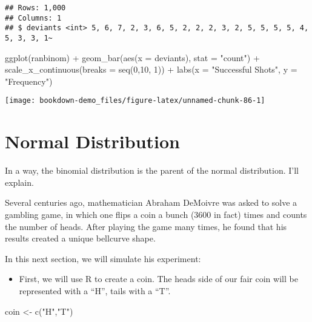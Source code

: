\documentclass[
]{book}
\newenvironment{Shaded}{\begin{snugshade}}{\end{snugshade}}
\newcommand{\AttributeTok}[1]{\textcolor[rgb]{0.77,0.63,0.00}{#1}}
\newcommand{\DecValTok}[1]{\textcolor[rgb]{0.00,0.00,0.81}{#1}}
\newcommand{\FunctionTok}[1]{\textcolor[rgb]{0.00,0.00,0.00}{#1}}
\newcommand{\NormalTok}[1]{#1}
\newcommand{\OtherTok}[1]{\textcolor[rgb]{0.56,0.35,0.01}{#1}}
\newcommand{\SpecialCharTok}[1]{\textcolor[rgb]{0.00,0.00,0.00}{#1}}
\newcommand{\StringTok}[1]{\textcolor[rgb]{0.31,0.60,0.02}{#1}}
\providecommand{\tightlist}{%
  \setlength{\itemsep}{0pt}\setlength{\parskip}{0pt}}
\begin{document}
\begin{verbatim}
## Rows: 1,000
## Columns: 1
## $ deviants <int> 5, 6, 7, 2, 3, 6, 5, 2, 2, 2, 3, 2, 5, 5, 5, 5, 4, 5, 3, 3, 1~
\end{verbatim}

\begin{Shaded}
\begin{Highlighting}[]
\FunctionTok{ggplot}\NormalTok{(ranbinom) }\SpecialCharTok{+}
  \FunctionTok{geom\_bar}\NormalTok{(}\FunctionTok{aes}\NormalTok{(}\AttributeTok{x =}\NormalTok{ deviants), }\AttributeTok{stat =} \StringTok{"count"}\NormalTok{) }\SpecialCharTok{+}
  \FunctionTok{scale\_x\_continuous}\NormalTok{(}\AttributeTok{breaks =} \FunctionTok{seq}\NormalTok{(}\DecValTok{0}\NormalTok{,}\DecValTok{10}\NormalTok{, }\DecValTok{1}\NormalTok{)) }\SpecialCharTok{+}
  \FunctionTok{labs}\NormalTok{(}\AttributeTok{x =} \StringTok{"Successful Shots"}\NormalTok{, }\AttributeTok{y =} \StringTok{"Frequency"}\NormalTok{)}
\end{Highlighting}
\end{Shaded}

\begin{center}\texttt{[image: bookdown-demo\_files/figure-latex/unnamed-chunk-86-1]} \end{center}

\hypertarget{normal-distribution-1}{%
\section{Normal Distribution}\label{normal-distribution-1}}

In a way, the binomial distribution is the parent of the normal distribution. I'll explain.

Several centuries ago, mathematician Abraham DeMoivre was asked to solve a gambling game, in which one flips a coin a bunch (3600 in fact) times and counts the number of heads. After playing the game many times, he found that his results created a unique bellcurve shape.

In this next section, we will simulate his experiment:

\begin{itemize}
\tightlist
\item
  First, we will use R to create a coin. The heads side of our fair coin will be represented with a ``H'', tails with a ``T''.
\end{itemize}

\begin{Shaded}
\begin{Highlighting}[]
\NormalTok{coin }\OtherTok{\textless{}{-}} \FunctionTok{c}\NormalTok{(}\StringTok{"H"}\NormalTok{,}\StringTok{"T"}\NormalTok{)}
\end{Highlighting}
\end{Shaded}
\end{document}

